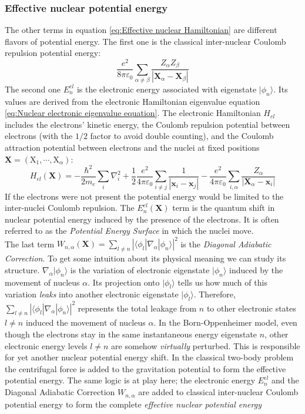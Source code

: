\documentclass[11pt,a4paper]{article}
\begin{document}
\subsubsection{Effective nuclear potential energy}
The other terms in equation \eqref{eq:Effective nuclear Hamiltonian} are different flavors of potential energy. The first one is the classical inter-nuclear Coulomb repulsion potential energy:
\begin{equation*}
	\frac{e^2}{8\pi\varepsilon_0} \sum_{\alpha \neq \beta} \frac{Z_\alpha Z_\beta}{|\mathbf{X}_\alpha - \mathbf{X}_\beta|}
\end{equation*}
The second one $E_n^{el}$ is the electronic energy associated with eigenstate $|\phi_n\rangle$. Its values are derived from the electronic Hamiltonian eigenvalue equation \eqref{eq:Nuclear electronic eigenvalue equation}. The electronic Hamiltonian $H_{el}$ includes the electrons’ kinetic energy, the Coulomb repulsion potential between electrons (with the $1/2$ factor to avoid double counting), and the Coulomb attraction potential between electrons and the nuclei at fixed positions $\mathbf{X}=(\mathrm{X}_1,\cdots,\mathrm{X}_\alpha)$:
\begin{equation*}
	H_{el}(\mathbf{X}) = -\frac{\hbar^2}{2m_e} \sum_i \nabla_i^2 + \frac{1}{2} \frac{e^2}{4\pi\varepsilon_0} \sum_{i \neq j} \frac{1}{|\mathbf{x}_i - \mathbf{x}_j|} - \frac{e^2}{4\pi\varepsilon_0} \sum_{i,\alpha} \frac{Z_\alpha}{|\mathbf{X}_\alpha - \mathbf{x}_i|}
\end{equation*}
If the electrons were not present the potential energy would be limited to the inter-nuclei Coulomb repulsion. The $E_n^{el}(\mathbf{X})$ term is the quantum shift in nuclear potential energy induced by the presence of the electrons. It is often referred to as the \emph{Potential Energy Surface} in which the nuclei move.\\ The last term $W_{n,\alpha}(\mathbf{X}) = \sum_{l \neq n} |\langle\phi_l | \nabla_\alpha | \phi_n\rangle|^2$ is the \emph{Diagonal Adiabatic Correction}. To get some intuition about its physical meaning we can study its structure.  $\nabla_\alpha | \phi_n\rangle$ is the variation of electronic eigenstate $|\phi_n\rangle$ induced by the movement of nucleus $\alpha$. Its projection onto $|\phi_l\rangle$ tells us how much of this variation \emph{leaks} into another electronic eigenstate $|\phi_l\rangle$. Therefore, $\sum_{l \neq n} |\langle\phi_l | \nabla_\alpha | \phi_n\rangle|^2$ represents the total leakage from $n$ to other electronic states $l \neq n$ induced the movement of nucleus $\alpha$. In the Born-Oppenheimer model, even though the electrons stay in the same instantaneous energy eigenstate $n$, other electronic energy levels $l \neq n$ are somehow \emph{virtually} perturbed. This is responsible for yet another nuclear potential energy shift. In the classical two-body problem the centrifugal force is added to the gravitation potential to form the effective potential energy. The same logic is at play here; the electronic energy $E_n^{el}$ and the Diagonal Adiabatic Correction $W_{n,\alpha}$ are added to classical inter-nuclear Coulomb potential energy to form the complete \emph{effective nuclear potential energy}
\end{document}
